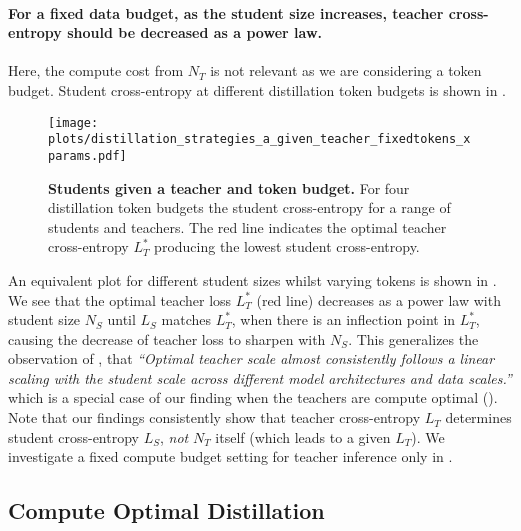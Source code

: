 \paragraph{For a fixed data budget, as the student size increases, teacher cross-entropy should be decreased as a power law.}
Here, the compute cost from $N_T$ is not relevant as we are considering a token budget.
Student cross-entropy at different distillation token budgets is shown in
.
\begin{figure}[h]
	\centering
	\texttt{[image: plots/distillation\_strategies\_a\_given\_teacher\_fixedtokens\_xparams.pdf]}
    \vspace{-0.25cm}
	\caption{\textbf{Students given a teacher and token budget.}
		For four distillation token budgets
		the student cross-entropy for a range of students and teachers.
		The red line indicates the optimal teacher cross-entropy $L_T^*$ producing the lowest student cross-entropy.
	}
    \vspace{-0.25cm}
	\label{fig:distillation-strategies-a-fixedtokens-xparams}
\end{figure}
An equivalent plot for different student sizes whilst varying tokens is shown in .
We see that the optimal teacher loss $L_T^*$ (red line) decreases as a power law with student size $N_S$ until $L_S$ matches $L_T^*$, when there is an inflection point in $L_T^*$, causing the decrease of teacher loss to sharpen with $N_S$.
This generalizes the observation of \citet{DBLP:journals/corr/abs-2311-07052}, that
\emph{
	``Optimal teacher scale almost consistently follows a linear scaling with the
	student scale across different model architectures and data scales.''}
which is a special case of our finding when the teachers are compute optimal ().
Note that our findings consistently show that teacher cross-entropy $L_T$ determines student cross-entropy $L_S$, \emph{not} $N_T$ itself (which leads to a given $L_T$).
We investigate a fixed compute budget setting for teacher inference only in .

\subsection{Compute Optimal Distillation}
\label{ssec:compute-optimal-distillation}

